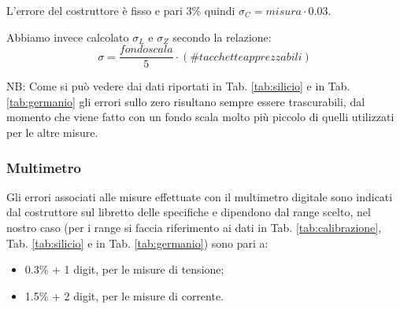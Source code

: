 \documentclass[a4paper, 11pt]{article}
\begin{document}
L'errore del costruttore è fisso e pari 3\% quindi $\sigma_C = misura \cdot 0.03$.

Abbiamo invece calcolato $\sigma_L$ e $\sigma_Z$ secondo la relazione: 
\begin{equation*}
    \sigma = \frac{fondo scala}{5} \cdot ( \# tacchette apprezzabili)
\end{equation*}

NB: Come si può vedere dai dati riportati in Tab. \ref{tab:silicio} e in Tab. \ref{tab:germanio} gli errori sullo zero risultano sempre essere trascurabili, dal momento che viene fatto con un fondo scala molto più piccolo di quelli utilizzati per le altre misure.

\subsubsection{Multimetro}
Gli errori associati alle misure effettuate con il multimetro digitale sono indicati dal costruttore sul libretto delle specifiche e dipendono dal range scelto, nel nostro caso (per i range si faccia riferimento ai dati in Tab. \ref{tab:calibrazione}, Tab. \ref{tab:silicio} e in Tab. \ref{tab:germanio}) sono pari a:
\begin{itemize}
    \item 0.3\% + 1 digit, per le misure di tensione;
    \item 1.5\% + 2 digit, per le misure di corrente.
\end{itemize}
\end{document}

